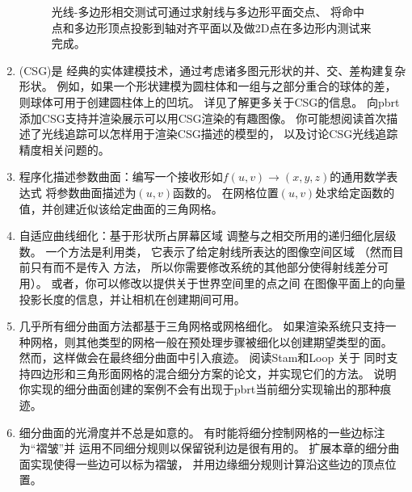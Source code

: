 \begin{enumerate}
\begin{figure}[htbp]
              \caption{光线-多边形相交测试可通过求射线与多边形平面交点、
                  将命中点和多边形顶点投影到轴对齐平面以及做2D点在多边形内测试来完成。}
              \label{fig:3.47}
          \end{figure}
    \item \circletwo {}(CSG)是
          经典的实体建模技术，通过考虑诸多图元形状的并、交、差构建复杂形状。
          例如，如果一个形状建模为圆柱体和一组与之部分重合的球体的差，
          则球体可用于创建圆柱体上的凹坑。
          详见\citet{10.5555/74803}了解更多关于CSG的信息。
          向pbrt添加CSG支持并渲染展示可以用CSG渲染的有趣图像。
          你可能想阅读首次描述了光线追踪可以怎样用于渲染CSG描述的模型的\citet{ROTH1982109}，
          以及讨论CSG光线追踪精度相关问题的\citet{10.5555/93267.93276}。
    \item \circletwo 程序化描述参数曲面：编写一个接收形如$f(u,v)\rightarrow(x,y,z)$的通用数学表达式
          将参数曲面描述为$(u,v)$函数的。
          在网格位置$(u,v)$处求给定函数的值，并创建近似该给定曲面的三角网格。
    \item \circletwo 自适应曲线细化：基于形状所占屏幕区域
          调整与之相交所用的递归细化层级数。
          一个方法是利用类，
          它表示了给定射线所表达的图像空间区域
          （然而目前只有而不是传入
          方法，
          所以你需要修改系统的其他部分使得射线差分可用）。
          或者，你可以修改以提供关于世界空间里的点之间
          在图像平面上的向量投影长度的信息，并让相机在创建期间可用。
    \item \circlethree 几乎所有细分曲面方法都基于三角网格或网格细化。
          如果渲染系统只支持一种网格，则其他类型的网格一般在预处理步骤被细化以创建期望类型的面。
          然而，这样做会在最终细分曲面中引入痕迹。
          阅读Stam和Loop \parencite*{10.1111/1467-8659.t01-2-00647}关于
          同时支持四边形和三角形面网格的混合细分方案的论文，并实现它们的方法。
          说明你实现的细分曲面创建的案例不会有出现于pbrt当前细分实现输出的那种痕迹。
    \item \circletwo 细分曲面的光滑度并不总是如意的。
          有时能将细分控制网格的一些边标注为“褶皱”并
          运用不同细分规则以保留锐利边是很有用的。
          扩展本章的细分曲面实现使得一些边可以标为褶皱，
          并用边缘细分规则计算沿这些边的顶点位置。

\end{enumerate}
